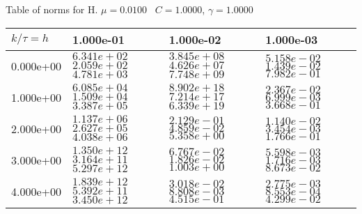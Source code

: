 \begin{center}
Table of norms for H. $\mu = 0.0100$ \, $C = 1.0000$, $\gamma = 1.0000$
  
\begin{tabular}{|p{1in}|p{1in}|p{1in}|p{1in}|} \hline
$k / \tau = h$ &1.000e-01 &1.000e-02 &1.000e-03 \\ \hline 
0.000e+00 & $6.341e+02$  $2.059e+02$  $4.781e+03$  & $3.845e+08$  $4.626e+07$  $7.748e+09$  & $5.158e-02$  $1.439e-02$  $7.982e-01$  \\ \hline 
1.000e+00 & $6.085e+04$  $1.509e+04$  $3.387e+05$  & $8.902e+18$  $7.214e+17$  $6.339e+19$  & $2.367e-02$  $6.999e-03$  $3.668e-01$  \\ \hline 
2.000e+00 & $1.137e+06$  $2.627e+05$  $4.038e+06$  & $2.129e-01$  $4.859e-02$  $5.358e+00$  & $1.140e-02$  $3.454e-03$  $1.766e-01$  \\ \hline 
3.000e+00 & $1.350e+12$  $3.164e+11$  $5.297e+12$  & $6.767e-02$  $1.826e-02$  $1.003e+00$  & $5.598e-03$  $1.716e-03$  $8.673e-02$  \\ \hline 
4.000e+00 & $1.839e+12$  $5.392e+11$  $3.450e+12$  & $3.018e-02$  $8.808e-03$  $4.515e-01$  & $2.775e-03$  $8.553e-04$  $4.299e-02$  \\ \hline 

\end{tabular}\\[20pt]
\end{center}
